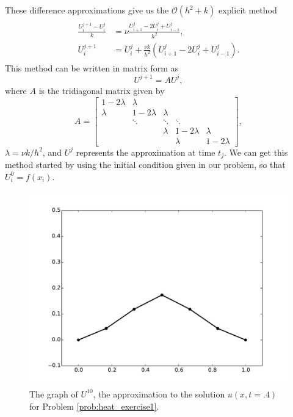 These difference approximations give us the $\mathcal{O}(h^2 + k)$ explicit method 
\begin{align}
	\begin{split}
	\frac{U_{i}^{j+1} - U_{i}^{j}}{k} &= \nu \frac{U_{i+1}^{j}- 2U_{i}^{j} + U_{i-1}^{j} }{h^2} ,\\ 
	U_{i}^{j+1} &= U_{i}^{j} + \frac{\nu k}{h^2} (U_{i+1}^{j}- 2U_{i}^{j} + U_{i-1}^{j} ). 
	\end{split}\label{eqn:firstorder_explicit}
\end{align}
This method can be written in matrix form as 
\[U^{j+1} = A U^j,\]
where $A$ is the tridiagonal matrix given by 
\[A = \left[\begin{array}{cccccc}1-2\lambda & \lambda & & & \\ \lambda & 1-2\lambda & \lambda & & \\ & \ddots & \ddots & \ddots & \\ & & \lambda & 1-2\lambda & \lambda \\  &  &  & \lambda & 1-2\lambda\end{array}\right],\]
$\lambda = \nu k/h^2$, and $U^j$ represents the approximation at time $t_j$.
We can get this method started by using the initial condition given in our problem, so that $U_{i}^{0} = f(x_i)$. 

\begin{figure}
\centering
\includegraphics[width=\textwidth]{heatexercise1b.pdf}
\caption{The graph of $U^{10}$, the approximation to the solution $u(x,t=.4)$ for Problem \ref{prob:heat_exercise1}.}
\label{fig:heatexercise1b}
\end{figure}

